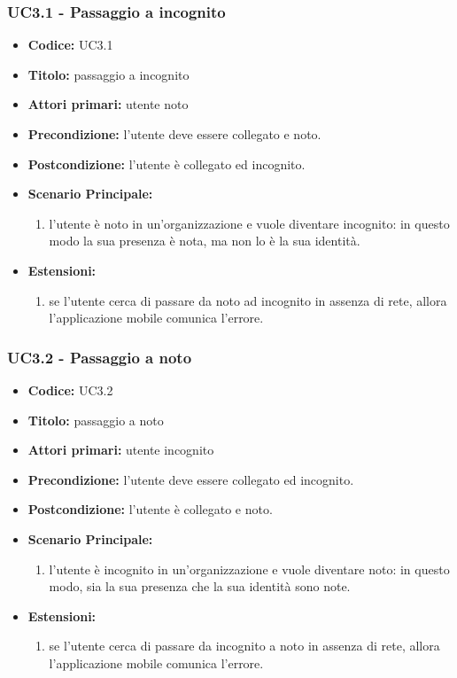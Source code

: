 \documentclass[casi-duso]{subfiles}
\begin{document}
\subsubsection{UC3.1 - Passaggio a incognito}
\label{sub:uc3.1utente}
\begin{itemize}
  \item \textbf{Codice:} UC3.1
  \item \textbf{Titolo:} passaggio a incognito
  \item \textbf{Attori primari:} utente noto
  \item \textbf{Precondizione:} l'utente deve essere collegato e noto.
  \item \textbf{Postcondizione:} l'utente è collegato ed incognito.
  \item \textbf{Scenario Principale:}
  \begin{enumerate}
    \item l'utente è noto in un'organizzazione e vuole diventare incognito: in questo modo la sua presenza è nota, ma non lo è la sua identità.
  \end{enumerate}
  \item \textbf{Estensioni:} 
  \begin{enumerate}
    \item se l'utente cerca di passare da noto ad incognito in assenza di rete, allora l'applicazione mobile comunica l'errore.
  \end{enumerate}
\end{itemize}

\subsubsection{UC3.2 - Passaggio a noto}
\label{sub:uc3.2utente}
\begin{itemize}
  \item \textbf{Codice:} UC3.2
  \item \textbf{Titolo:} passaggio a noto
  \item \textbf{Attori primari:} utente incognito
  \item \textbf{Precondizione:} l'utente deve essere collegato ed incognito.
  \item \textbf{Postcondizione:} l'utente è collegato e noto.
  \item \textbf{Scenario Principale:}
  \begin{enumerate}
    \item l'utente è incognito in un'organizzazione e vuole diventare noto: in questo modo, sia la sua presenza che la sua identità sono note.
  \end{enumerate}
  \item \textbf{Estensioni:} 
  \begin{enumerate}
    \item se l'utente cerca di passare da incognito a noto in assenza di rete, allora l'applicazione mobile comunica l'errore.
  \end{enumerate}
\end{itemize}
\end{document}
